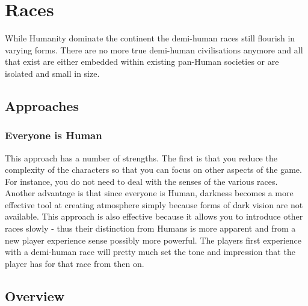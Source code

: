 \chapter{Races}\label{races}
\newpage
While Humanity dominate the continent the demi-human races still flourish in varying forms. There are no more true demi-human civilisations anymore and all that exist are either embedded within existing pan-Human societies or are isolated and small in size. 

\section{Approaches}
\subsection{Everyone is Human} This approach has a number of strengths. The first is that you reduce the complexity of the characters so that you can focus on other aspects of the game. For instance, you do not need to deal with the senses of the various races. Another advantage is that since everyone is Human, darkness becomes a more effective tool at creating atmosphere simply because forms of dark vision are not available. This approach is also effective because it allows you to introduce other races slowly - thus their distinction from Humans is more apparent and from a new player experience sense possibly more powerful. The players first experience with a demi-human race will pretty much set the tone and impression that the player has for that race from then on. 

%
%
%

\section{Overview}

